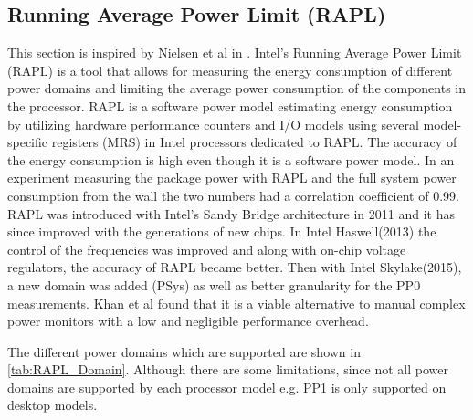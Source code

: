 \subsection{Running Average Power Limit (RAPL)}\label{subsec:rapl}
This section is inspired by Nielsen et al in \cite{Doom2021}.
Intel's Running Average Power Limit (RAPL) is a tool that allows for measuring the energy consumption of different power domains and limiting the average power consumption of the components in the processor. RAPL is a software power model estimating energy consumption by utilizing hardware performance counters and I/O models using several model-specific registers (MRS) in Intel processors dedicated to RAPL.\cite{Power-Management_Sandy_Bridge,Zhang2021} The accuracy of the energy consumption is high even though it is a software power model\cite{RAPL_ACU1,hackenberg2013}. In an experiment measuring the package power with RAPL and the full system power consumption from the wall the two numbers had a correlation coefficient of 0.99.\cite{RAPL_in_action} RAPL was introduced with Intel's Sandy Bridge architecture in 2011 and it has since improved with the generations of new chips. In Intel Haswell(2013) the control of the frequencies was improved and along with on-chip voltage regulators, the accuracy of RAPL became better. Then with Intel Skylake(2015), a new domain was added (PSys) as well as better granularity for the PP0 measurements. Khan et al found that it is a viable alternative to manual complex power monitors with a low and negligible performance overhead. \cite{RAPL_in_action}

The different power domains which are supported are shown in \cref{tab:RAPL_Domain}. Although there are some limitations, since not all power domains are supported by each processor model e.g. PP1 is only supported on desktop models.


